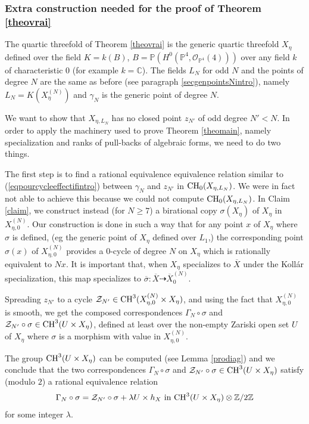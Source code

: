 \documentclass[10pt]{article}
\begin{document}
\subsubsection{Extra construction needed   for the proof of Theorem \ref{theovrai}\label{secintroextratrick}}
The quartic threefold of Theorem \ref{theovrai} is the generic quartic threefold $X_\eta$ defined over the field $K=k(B)$, $B=\mathbb{P}(H^0(\mathbb{P}^4, \mathcal{O}_{\mathbb{P}^4}(4)))$ over any field $k$ of characteristic $0$ (for example $k=\mathbb{C}$). The fields $L_N$ for odd $N$ and the points of degree $N$ are the same as before (see paragraph \ref{secgenpointsNintro}), namely
$L_N=K(X_\eta^{(N)})$ and $\gamma_N$ is the generic point of degree $N$.

We want to show that $X_{\eta,L_N}$ has no closed point $z_{N'}$  of  odd degree $N'<N$.  In order to apply the machinery used to prove Theorem \ref{theomain}, namely specialization and ranks of pull-backs of  algebraic forms, we need to do two things.

The first step is to find a rational equivalence equivalence relation similar to (\ref{eqpourcycleeffectifintro}) between $\gamma_N$ and $z_{N'}$ in ${\rm CH}_0(X_{\eta,L_N})$. We were in fact  not able to achieve this because we could not compute ${\rm CH}_0(X_{\eta,L_N})$. In Claim \ref{claim}, we construct instead (for $N\geq 7$)   a birational copy $\sigma(X_\eta)$ of $X_\eta$ in $X^{(N)}_{\eta,0}$. Our construction is done in such a way that for any point $x$ of $X_\eta$ where $\sigma$ is defined, (eg the generic point of $X_\eta$ defined over $L_1$,)  the corresponding point $\sigma(x)$ of $ X^{(N)}_{\eta,0}$ provides a $0$-cycle of degree $N$ on $X_\eta$ which is rationally equivalent to $Nx$. It is important that, when $X_\eta$ specializes to $\overline{X}$ under the Koll\'ar specialization, this map specializes to
$\overline{\sigma} : \overline{X}\dashrightarrow \overline{X}^{(N)}_0$.

 Spreading $z_{N'}$ to a cycle $\mathcal{Z}_{N'}\in{\rm CH}^3(X^{(N)}_{\eta,0}\times X_\eta)$, and using the fact that  $X^{(N)}_{\eta,0}$ is smooth, we get the composed correspondences
$\Gamma_N\circ \sigma$ and  $\mathcal{Z}_{N'}\circ \sigma\in {\rm CH}^3(U\times X_\eta)$, defined at least  over the non-empty Zariski open set $U$ of $X_\eta$ where $\sigma$ is a morphism with  value in $X^{(N)}_{\eta,0}$.

The group  ${\rm CH}^3(U\times X_\eta)$ can be computed  (see Lemma \ref{prodiag}) and we conclude that the two  correspondences
$\Gamma_N\circ \sigma$ and  $\mathcal{Z}_{N'}\circ \sigma\in {\rm CH}^3(U\times X_\eta)$  satisfy (modulo $2$) a rational equivalence relation
$$\Gamma_N\circ \sigma=\mathcal{Z}_{N'}\circ \sigma+\lambda U\times h_X\,\,{\rm in}\,\, {\rm CH}^3(U\times  X_\eta)\otimes\mathbb{Z}/2\mathbb{Z}$$
for some integer $\lambda$.
\end{document}
